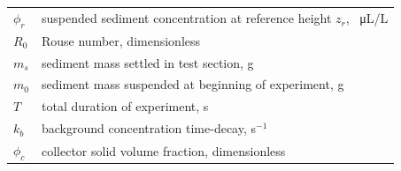 \documentclass[geosciences,article,submit,moreauthors,pdftex]{Definitions/mdpi}
\begin{document}
{\begin{tabular}{@{}ll}
 $\phi_r$ & suspended sediment concentration at reference height $z_r$, \SI{}{\micro\liter/\liter} \\
 $R_0$ & Rouse number, dimensionless \\
 $m_s$ & sediment mass settled in test section, g \\
 $m_0$ & sediment mass suspended at beginning of experiment, g \\
 $T$ & total duration of experiment, s \\
 $k_b$ & background concentration time-decay, s$^{-1}$ \\
 $\phi_c$ & collector solid volume fraction, dimensionless \\
  \end{tabular}}




\end{document}
